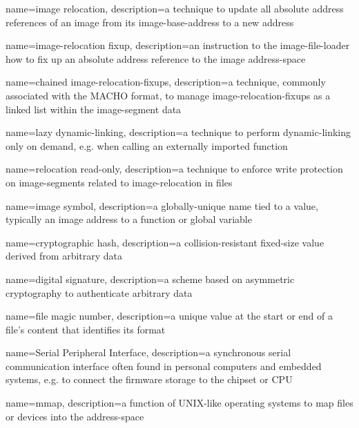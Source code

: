 {
  name={\gls{image} relocation},
  description={a technique to update all absolute address references of an \gls{image} from its \gls{image-base-address} to a new address}
}

{
  name={\gls{image-relocation} fixup},
  description={an instruction to the \gls{image-file-loader} how to fix up an absolute address reference to the \gls{image} \gls{address-space}}
}

{
  name={chained \glspl{image-relocation-fixup}},
  description={a technique, commonly associated with the \gls{MACHO} format, to manage \glspl{image-relocation-fixup} as a linked list within the \gls{image-segment} data}
}

{
  name={lazy \gls{dynamic-linking}},
  description={a technique to perform \gls{dynamic-linking} only on demand, e.g. when calling an externally imported function}
}

{
  name={relocation read-only},
  description={a technique to enforce write protection on \glspl{image-segment} related to \gls{image-relocation} in  files}
}

{
  name={\gls{image} symbol},
  description={a globally-unique name tied to a value, typically an \gls{image} address to a function or global variable}
}

{
  name={cryptographic hash},
  description={a collision-resistant fixed-size value derived from arbitrary data}
}

{
  name={digital signature},
  description={a scheme based on asymmetric cryptography to authenticate arbitrary data}
}

{
  name={file magic number},
  description={a unique value at the start or end of a file's content that identifies its format}
}

{
  name={Serial Peripheral Interface},
  description={a synchronous serial communication interface often found in personal computers and embedded systems, e.g. to connect the \gls{firmware} storage to the chipset or \gls{CPU}}
}

{
  name={mmap},
  description={a function of UNIX-like operating systems to map files or devices into the \gls{address-space}}
}

